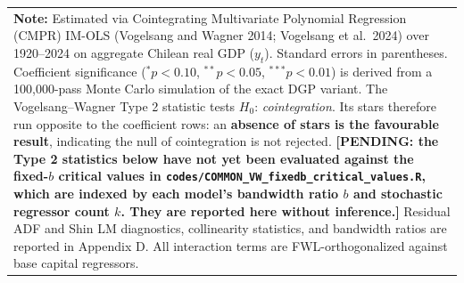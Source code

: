 \begin{table}[H]
\begin{tabular}{p{4.2cm}p{1.4cm}p{1.4cm}p{1.4cm}p{1.4cm}p{1.4cm}}
\bottomrule
\multicolumn{6}{p{11.2cm}}{\footnotesize \textbf{Note:} Estimated via Cointegrating Multivariate Polynomial Regression (CMPR) IM-OLS (Vogelsang and Wagner 2014; Vogelsang et al.\ 2024) over 1920--2024 on aggregate Chilean real GDP ($y_t$). Standard errors in parentheses. Coefficient significance ($^* p < 0.10$, $^{**} p < 0.05$, $^{***} p < 0.01$) is derived from a 100,000-pass Monte Carlo simulation of the exact DGP variant. The Vogelsang--Wagner Type 2 statistic tests $H_0$: \emph{cointegration}. Its stars therefore run opposite to the coefficient rows: an \textbf{absence of stars is the favourable result}, indicating the null of cointegration is not rejected. \textbf{[PENDING: the Type 2 statistics below have not yet been evaluated against the fixed-$b$ critical values in \texttt{codes/COMMON\_VW\_fixedb\_critical\_values.R}, which are indexed by each model's bandwidth ratio $b$ and stochastic regressor count $k$. They are reported here without inference.]} Residual ADF and Shin LM diagnostics, collinearity statistics, and bandwidth ratios are reported in Appendix D. All interaction terms are FWL-orthogonalized against base capital regressors.} \\
\end{tabular}
\end{table}
